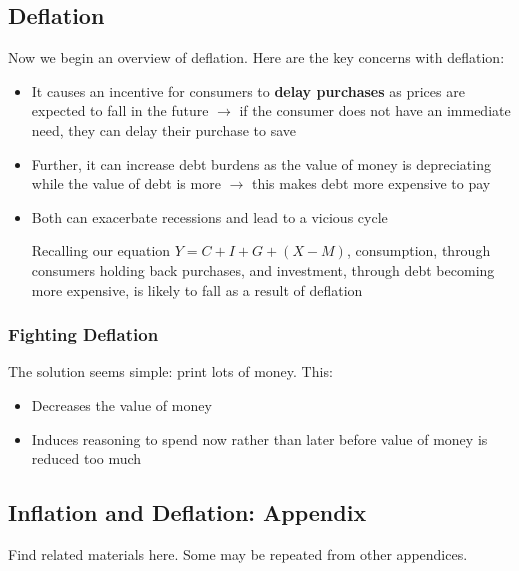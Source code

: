 \documentclass[12pt, letterpaper]{article}
\begin{document}
\subsection{Deflation}
Now we begin an overview of deflation. Here are the key concerns with deflation:
\begin{itemize}
	\item It causes an incentive for consumers to \textbf{delay purchases} as prices are expected to fall in the future $\rightarrow$ if the consumer does not have an immediate need, they can delay their purchase to save
	\item Further, it can increase debt burdens as the value of money is depreciating while the value of debt is more $\rightarrow$ this makes debt more expensive to pay
	\item Both can exacerbate recessions and lead to a vicious cycle
		\begin{center}
			Recalling our equation $Y = C + I + G + (X-M)$, consumption, through consumers holding back purchases, and investment, through debt becoming more expensive, is likely to fall as a result of deflation
		\end{center}
\end{itemize}

\subsubsection{Fighting Deflation}
The solution seems simple: print lots of money. This:
\begin{itemize}
	\item Decreases the value of money
	\item Induces reasoning to spend now rather than later before value of money is reduced too much
\end{itemize}

\subsection{Inflation and Deflation: Appendix}
Find related materials here. Some may be repeated from other appendices.

\newpage
\end{document}
